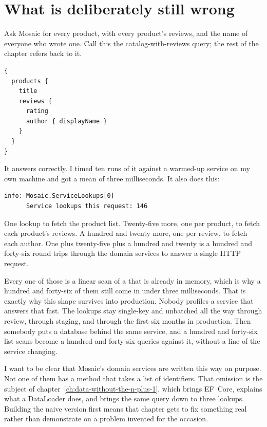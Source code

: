 \section{What is deliberately still wrong}
\label{sec:ch02-still-wrong}

Ask Mosaic for every product, with every product's reviews, and the name of
everyone who wrote one. Call this the catalog-with-reviews query; the rest of
the chapter refers back to it.

\begin{verbatim}
{
  products {
    title
    reviews {
      rating
      author { displayName }
    }
  }
}
\end{verbatim}

It answers correctly. I timed ten runs of it against a warmed-up service on my
own machine and got a mean of three milliseconds. It also does this:

\begin{verbatim}
info: Mosaic.ServiceLookups[0]
      Service lookups this request: 146
\end{verbatim}

%
One lookup to fetch the product list. Twenty-five more, one per product, to
fetch each product's reviews. A hundred and twenty more, one per review, to
fetch each author. One plus twenty-five plus a hundred and twenty is a hundred
and forty-six round trips through the domain services to answer a single HTTP
request.

Every one of those is a linear scan of a  that is already in
memory, which is why a hundred and forty-six of them still come in under three
milliseconds. That is exactly why this shape survives into production. Nobody
profiles a service that answers that fast. The lookups stay single-key and
unbatched all the way through review, through staging, and through the first six
months in production. Then somebody puts a database behind the same service, and
a hundred and forty-six list scans become a hundred and forty-six queries against
it, without a line of the service changing.

%
I want to be clear that Mosaic's domain services are written this way on
purpose. Not one of them has a method that takes a list of identifiers. That
omission is the subject of chapter~\ref{ch:data-without-the-n-plus-1}, which
brings EF~Core, explains what a DataLoader does, and brings the same query down
to three lookups. Building the naive version first means that chapter gets to
fix something real rather than demonstrate on a problem invented for the
occasion.

